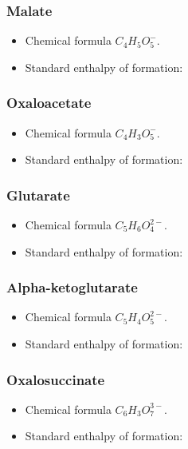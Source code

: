 \documentclass{article}
\begin{document}
\subsubsection{Malate}
\begin{itemize}
    \item Chemical formula $C_4H_5O_5^-$.
    \item Standard enthalpy of formation:
\end{itemize}

\subsubsection{Oxaloacetate}
\begin{itemize}
    \item Chemical formula $C_4H_3O_5^-$.
    \item Standard enthalpy of formation:
\end{itemize}

\subsubsection{Glutarate}
\begin{itemize}
    \item Chemical formula $C_5H_6O_4^{2-}$.
    \item Standard enthalpy of formation:
\end{itemize}

\subsubsection{Alpha-ketoglutarate}
\begin{itemize}
    \item Chemical formula $C_5H_4O_5^{2-}$.
    \item Standard enthalpy of formation:
\end{itemize}

\subsubsection{Oxalosuccinate}
\begin{itemize}
    \item Chemical formula $C_6H_3O_7^{3-}$.
    \item Standard enthalpy of formation:
\end{itemize}
\end{document}
